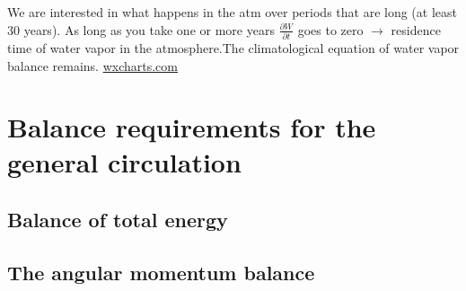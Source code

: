 We are interested in what happens in the atm over periods that are long (at least 30 years). As long as you take one or more years $\frac{\partial W}{\partial t}$ goes to zero $\rightarrow$ residence time of water vapor in the atmosphere.The climatological equation of water vapor balance remains.
\url{wxcharts.com}










\section{Balance requirements for the general circulation}
\subsection{Balance of total energy}

\subsection{The angular momentum balance}


